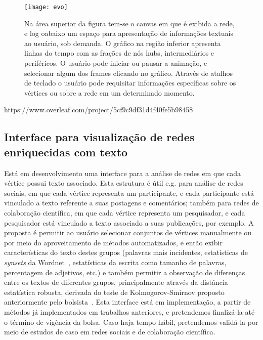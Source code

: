 \documentclass[a4paper, 11pt]{article}
\begin{document}
\begin{figure}[h!]
\centering
  \texttt{[image: evo]}
\caption{%
  Na área superior da figura tem-se o canvas em que é exibida a rede, e log oabaixo um espaço para apresentação de informações textuais ao usuário, sob demanda. O gráfico na região inferior apresenta linhas do tempo com as frações de nós hubs, intermediários e periféricos.
  O usuário pode iniciar ou pausar a animação, e selecionar algum dos frames clicando no gráfico.
  Através de atalhos de teclado o usuário pode requisitar informações específicas sobre os vértices ou sobre a rede em um determinado momento.
}\label{evo}
\end{figure}
https://www.overleaf.com/project/5cf9c9df31d4f40fe5b98458
\subsection{Interface para visualização de redes enriquecidas com texto}
Está em desenvolvimento uma interface para a análise de redes em que cada vértice possui texto associado.
Esta estrutura é útil e.g. para análise de redes sociais, em que cada vértice representa um participante, e cada participante está vinculado a texto referente a suas postagens e comentários;
também para redes de colaboração científica, em que cada vértice representa um pesquisador, e cada pesquisador está vinculado a texto associado a suas publicações, por exemplo.
A proposta  é permitir ao usuário selecionar conjuntos de vértices manualmente ou por meio  do aproveitamento de métodos automatizados,
e então exibir características do texto destes grupos (palavras mais incidentes,
estatísticas de \emph{synsets} da Wordnet~\cite{wn}, estatísticas da escrita como tamanho de palavras, percentagem de adjetivos, etc.) e também permitir a observação de diferenças
entre os textos de diferentes grupos, principalmente através da distância estatística robusta, derivada do teste de Kolmogorov-Smirnov proposto anteriormente pelo bolsista~\cite{ks}.
Esta interface está em implementação, a partir de métodos já implementados em trabalhos anteriores, e pretendemos finalizá-la até o término de vigência da bolsa. Caso haja tempo hábil, pretendemos validá-la por meio de estudos de caso em redes sociais e de colaboração científica.
\end{document}
